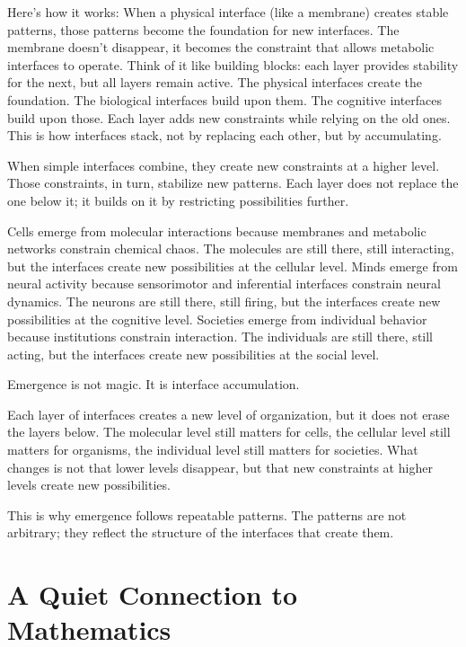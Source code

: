 \documentclass[
  openright]{book}
\begin{document}
Here's how it works: When a physical interface (like a membrane) creates
stable patterns, those patterns become the foundation for new
interfaces. The membrane doesn't disappear, it becomes the constraint
that allows metabolic interfaces to operate. Think of it like building
blocks: each layer provides stability for the next, but all layers
remain active. The physical interfaces create the foundation. The
biological interfaces build upon them. The cognitive interfaces build
upon those. Each layer adds new constraints while relying on the old
ones. This is how interfaces stack, not by replacing each other, but by
accumulating.

When simple interfaces combine, they create new constraints at a higher
level. Those constraints, in turn, stabilize new patterns. Each layer
does not replace the one below it; it builds on it by restricting
possibilities further.

Cells emerge from molecular interactions because membranes and metabolic
networks constrain chemical chaos. The molecules are still there, still
interacting, but the interfaces create new possibilities at the cellular
level. Minds emerge from neural activity because sensorimotor and
inferential interfaces constrain neural dynamics. The neurons are still
there, still firing, but the interfaces create new possibilities at the
cognitive level. Societies emerge from individual behavior because
institutions constrain interaction. The individuals are still there,
still acting, but the interfaces create new possibilities at the social
level.

Emergence is not magic. It is
interface accumulation.

Each layer of interfaces creates a new level of organization, but it
does not erase the layers below. The molecular level still matters for
cells, the cellular level still matters for organisms, the individual
level still matters for societies. What changes is not that lower levels
disappear, but that new constraints at higher levels create new
possibilities.

This is why emergence follows repeatable patterns. The patterns are not
arbitrary; they reflect the structure of the interfaces that create
them.

\section{A Quiet Connection to
Mathematics}\label{a-quiet-connection-to-mathematics}
\end{document}
